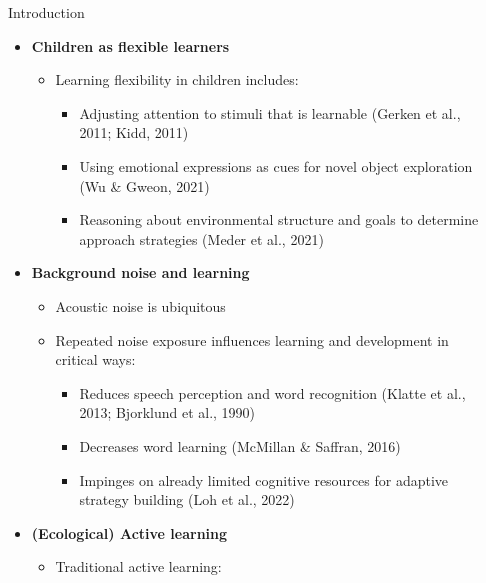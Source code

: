 \documentclass[final]{beamer}
\newlength{\sepwidth}
\newlength{\colwidth}
\newcommand{\separatorcolumn}{\begin{column}{\sepwidth}\end{column}}
\begin{document}
\begin{frame}[t]
\begin{columns}[t]
\separatorcolumn

\begin{column}{\colwidth}

  \begin{block}{Introduction}

    \begin{itemize}
      \item \textbf{Children as flexible learners}
        \begin{itemize}
          \item Learning flexibility in children includes:
            \begin{itemize}
              \item Adjusting attention to stimuli that is learnable (Gerken et al., 2011; Kidd, 2011)
              \item Using emotional expressions as cues for novel object exploration (Wu \& Gweon, 2021)
              \item Reasoning about environmental structure and goals to determine approach strategies (Meder et al., 2021)
            \end{itemize}
        \end{itemize}
      \item \textbf{Background noise and learning}
        \begin{itemize}
          \item Acoustic noise is ubiquitous
          \item Repeated noise exposure influences learning and development in critical ways:
            \begin{itemize}
              \item Reduces speech perception and word recognition (Klatte et al., 2013; Bjorklund et al., 1990)
              \item Decreases word learning (McMillan \& Saffran, 2016)
              \item Impinges on already limited cognitive resources for adaptive strategy building (Loh et al., 2022)
            \end{itemize}
        \end{itemize}
      \item \textbf{(Ecological) Active learning}
        \begin{itemize}
          \item Traditional active learning:
            \begin{itemize}

\end{itemize}
\end{itemize}
\end{itemize}
\end{block}
\end{column}
\end{columns}
\end{frame}
\end{document}
